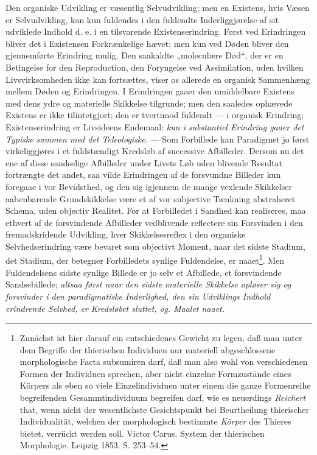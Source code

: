 \documentclass[12pt,a4paper]{book}
\begin{document}
Den organiske Udvikling er væsentlig Selvudvikling; men en Existens,
hvis Væsen er Selvudvikling, kan kun fuldendes i den fuldendte
Inderliggjørelse af sit udviklede Indhold d. e. i en tilsvarende
Existenserindring. Først ved Erindringen bliver det i Existensen
Forkrænkelige hævet; men kun ved Døden bliver den gjennemførte Erindring
mulig. Den saakaldte „moleculære Død“, der er en Betingelse for den
Reproduction, den Foryngelse ved Assimilation, uden hvilken
Livsvirksomheden ikke kan fortsættes, viser os allerede en organisk
Sammenhæng mellem Døden og Erindringen. I Erindringen gaaer den
umiddelbare Existens med dens ydre og materielle Skikkelse tilgrunde;
men den saaledes ophævede Existens er ikke tilintetgjort; den er
tvertimod fuldendt --- i organisk Erindring; Existenserindring er
Livsideens Endemaal: \emph{kun i substantiel Erindring gaaer det Typiske
sammen med det Teleologiske.} --- Som Forbillede kan Paradigmet jo først
virkeliggjøres i et fuldstændigt Kredsløb af successive Afbilleder.
Dersom nu det ene af disse sandselige Afbilleder under Livets Løb uden
blivende Resultat fortrængte det andet, saa vilde Erindringen af de
forsvundne Billeder kun foregaae i vor Bevidsthed, og den sig igjennem
de mange vexlende Skikkelser aabenbarende Grundskikkelse være et af vor
subjective Tænkning abstraheret Schema, uden objectiv Realitet. For at
Forbilledet i Sandhed kan realiseres, maa ethvert af de forsvindende
Afbilleder vedblivende reflectere sin Forsvinden i den fremadskridende
Udvikling, hver Skikkelsesreflex i den organiske Selvhedserindring være
bevaret som objectivt Moment, naar det sidste Stadium, det Stadium, der
betegner Forbilledets
\setcounter{footnote}{0}
synlige Fuldendelse, er naaet\footnote{Zunächst ist hier darauf ein
entschiedenes Gewicht zu legen, daß man unter dem Begriffe der
thierischen Individuen nur materiell abgeschlossene morphologische Facta
subsumiren darf, daß man also wohl von verschiedenen Formen der
Individuen sprechen, aber nicht einzelne Formzustände eines Körpers als
eben so viele Einzelindividuen unter einem die ganze Formenreihe
begreifenden Gesammtindividuum begreifen darf, wie es neuerdings
\emph{Reichert} that, wenn nicht der wesentlichste Gesichtspunkt bei
Beurtheilung thierischer Individualität, welchen der morphologisch
bestimmte \emph{Körper} des Thieres bietet, verrückt werden soll. Victor
Carus. System der thierischen Morphologie. Leipzig 1853. S.
253--54.}. Men Fuldendelsens sidste synlige Billede er jo selv et
Afbillede, et forsvindende Sandsebillede; \emph{altsaa først naar den
sidste materielle Skikkelse opløser sig og forsvinder i den
paradigmatiske Inderlighed, den sin Udviklings Indhold erindrende
Selvhed, er Kredsløbet sluttet, og. Maalet naaet.}
\end{document}

